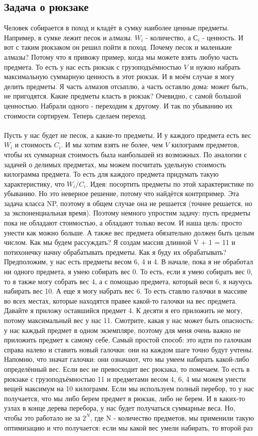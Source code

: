 \documentclass[a4paper,12pt]{article}
\begin{document}
\subsection{Задача о рюкзаке}
Человек собирается в поход и кладёт в сумку наиболее ценные предметы. Например, в сумке лежит песок и алмазы. $W_i$ - количество, а $С_i$ - ценность. И вот с таким рюкзаком он решил пойти в поход. Почему песок и маленькие алмазы? Потому что я привожу пример, когда мы можете взять любую часть предмета. То есть у нас есть рюкзак с грузоподъёмностью $V$ и нужно набрать максимальную суммарную ценность в этот рюкзак. И в моём случае я могу делить предметы. Я часть алмазов отсыплю, а часть оставлю дома: может быть, не пригодятся. Какие предметы класть в рюкзак? Очевидно, с самой большой ценностью. Набрали одного - переходим к другому. И так по убыванию их стоимости сортируем. Теперь сделаем переход. \\ \\Пусть у нас будет не песок, а какие-то предметы. И у каждого предмета есть вес $W_i$ и стоимость $C_i$. И мы хотим взять не более, чем $V$ килограмм предметов, чтобы их суммарная стоимость была наибольшей из возможных. По аналогии с задачей о делимых предметах, мы можем посчитать удельную стоимость килограмма предмета. То есть для каждого предмета придумать такую характеристику, что $W_i/C_i$. Идея: посортить предметы по этой характеристике по убыванию. Но это неверное решение, потому что найдётся контрпример. Эта задача класса NP, поэтому в общем случае она не решается (точнее решается, но за экспоненциальная время). Поэтому немного упростим задачу: пусть предметы пока не обладают стоимостью, а обладают только весом. И наша цель: просто унести как можно больше. А также вес предмета обязательно должен быть целым числом. Как мы будем рассуждать? Я создам массив длинной V + 1 = 11 и потихонечку начну обрабатывать предметы. Как я буду их обрабатывать? Предположим, у нас есть предметы весом 6, 4 и 4. В начале, пока я не обработал ни одного предмета, я умею собирать вес 0. То есть, если я умею собирать вес 0, то я также могу собрать вес 4, а с помощью предмета, который веси 6, я научусь набирать вес 10. А еще я могу набрать вес 6. То есть ставлю галочки в массиве во всех местах, которые находятся правее какой-то галочки на вес предмета. Давайте я приложу оставшийся предмет 4. К десяти я его приложить не могу, потому максимальный вес у нас 11. Смотрите, какая у нас может быть опасность: у нас каждый предмет в одном экземпляре, поэтому для меня очень важно не приложить предмет к самому себе. Самый простой способ: это идти по галочкам справа налево и ставить новый галочки: они на каждом шаге точно будут учтены. Напомню, что значат галочки: они означают, что мы умеем набирать какой-либо определённый вес. Если вес не превосходит вес рюкзака, то помечаем. То есть в рюкзаке с грузоподъёмностью 11 и предметами весом 4, 6, 4 мы можем унести вещей максимум на 10 килограмм. Если мы используем полный перебор, то у нас получается, что мы либо берем предмет в рюкзак, либо не берем. И в каких-то узлах в конце дерева перебора, у нас будет получаться суммарные веса. Но, чтобы это работало не за $2^N$, где N - количество предметов, мы применили такую оптимизацию и что получается: если мы какой вес умели набирать, то второй раз 
\end{document}
